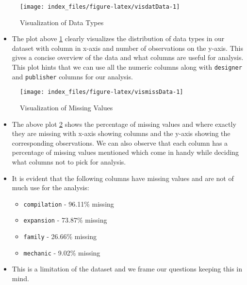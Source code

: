 \documentclass[
]{article}
\providecommand{\tightlist}{%
  \setlength{\itemsep}{0pt}\setlength{\parskip}{0pt}}
\begin{document}
\begin{figure}[H]

{\centering \texttt{[image: index\_files/figure-latex/visdatData-1]} 

}

\caption{Visualization of Data Types}\label{fig:visdatData}
\end{figure}

\begin{itemize}
\tightlist
\item
  The plot above \ref{fig:visdatData} clearly visualizes the distribution of data types in our dataset with column in x-axis and number of observations on the y-axis. This gives a concise overview of the data and what columns are useful for analysis. This plot hints that we can use all the numeric columns along with \texttt{designer} and \texttt{publisher} columns for our analysis.
\end{itemize}

\begin{figure}[H]

{\centering \texttt{[image: index\_files/figure-latex/vismissData-1]} 

}

\caption{Visualization of Missing Values}\label{fig:vismissData}
\end{figure}

\begin{itemize}
\item
  The above plot \ref{fig:vismissData} shows the percentage of missing values and where exactly they are missing with x-axis showing columns and the y-axis showing the corresponding observations. We can also observe that each column has a percentage of missing values mentioned which come in handy while deciding what columns not to pick for analysis.
\item
  It is evident that the following columns have missing values and are not of much use for the analysis:

  \begin{itemize}
  \tightlist
  \item
    \texttt{compilation} - 96.11\% missing
  \item
    \texttt{expansion} - 73.87\% missing
  \item
    \texttt{family} - 26.66\% missing
  \item
    \texttt{mechanic} - 9.02\% missing
  \end{itemize}
\item
  This is a limitation of the dataset and we frame our questions keeping this in mind.
\end{itemize}
\end{document}
